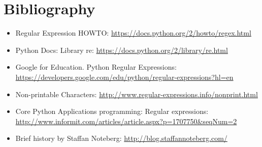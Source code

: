 \documentclass{beamer}
\begin{document}
\section{Bibliography}
\begin{frame}
\begingroup
 \fontsize{6pt}{8pt}\selectfont
\begin{itemize}
\item Regular Expression HOWTO: \url{https://docs.python.org/2/howto/regex.html}
\item Python Docs: Library re: \url{https://docs.python.org/2/library/re.html}
\item Google for Education. Python Regular Expressions: \url{https://developers.google.com/edu/python/regular-expressions?hl=en}
\item Non-printable Characters: \url{http://www.regular-expressions.info/nonprint.html}
\item Core Python Applications programming: Regular expressions: \url{http://www.informit.com/articles/article.aspx?p=1707750&seqNum=2}
\item Brief history by Staffan Noteberg: \url{http://blog.staffannoteberg.com/}
\end{itemize}
\endgroup
\end{frame}
\end{document}

